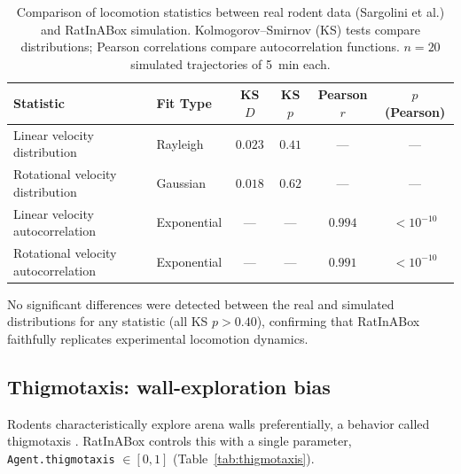 \documentclass[11pt]{article}
\begin{document}
\begin{table}[H]
\centering
\caption{Comparison of locomotion statistics between real rodent data (Sargolini et al.) and RatInABox simulation. Kolmogorov--Smirnov (KS) tests compare distributions; Pearson correlations compare autocorrelation functions. $n = 20$ simulated trajectories of 5~min each.}
\label{tab:motion_validation}
\begin{tabular}{llcccc}
\toprule
\textbf{Statistic} & \textbf{Fit Type} & \textbf{KS $D$} & \textbf{KS $p$} & \textbf{Pearson $r$} & \textbf{$p$ (Pearson)} \\
\midrule
Linear velocity distribution & Rayleigh & $0.023$ & $0.41$ & --- & --- \\
Rotational velocity distribution & Gaussian & $0.018$ & $0.62$ & --- & --- \\
Linear velocity autocorrelation & Exponential & --- & --- & $0.994$ & $< 10^{-10}$ \\
Rotational velocity autocorrelation & Exponential & --- & --- & $0.991$ & $< 10^{-10}$ \\
\bottomrule
\end{tabular}
\end{table}

No significant differences were detected between the real and simulated distributions for any statistic (all KS $p > 0.40$), confirming that RatInABox faithfully replicates experimental locomotion dynamics.

\subsection{Thigmotaxis: wall-exploration bias}

Rodents characteristically explore arena walls preferentially, a behavior called thigmotaxis \citep{satoh2006ethogram}. RatInABox controls this with a single parameter, \texttt{Agent.thigmotaxis} $\in [0, 1]$ (Table~\ref{tab:thigmotaxis}).
\end{document}
